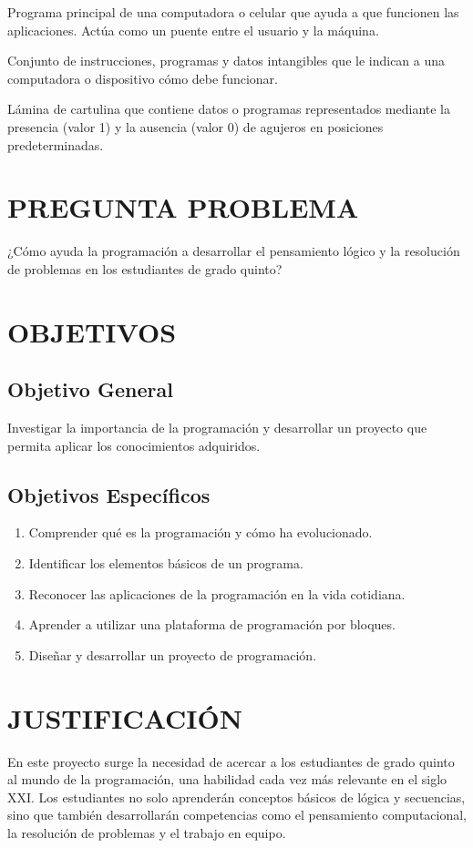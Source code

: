 \documentclass[12pt,letterpaper]{article}
\newenvironment{glosario}{\begin{description}[leftmargin=0pt,labelindent=0pt,itemsep=4pt,font=\normalfont\bfseries]\singlespacing}{\end{description}}
\begin{document}
\begin{glosario}
\item[Sistemas operativos:] Programa principal de una computadora o celular que ayuda a que funcionen las aplicaciones. Actúa como un puente entre el usuario y la máquina.
\item[Software:] Conjunto de instrucciones, programas y datos intangibles que le indican a una computadora o dispositivo cómo debe funcionar.
\item[Tarjetas perforadas:] Lámina de cartulina que contiene datos o programas representados mediante la presencia (valor 1) y la ausencia (valor 0) de agujeros en posiciones predeterminadas.
\end{glosario}

\section{PREGUNTA PROBLEMA}
\noindent ¿Cómo ayuda la programación a desarrollar el pensamiento lógico y la resolución de problemas en los estudiantes de grado quinto?

\section{OBJETIVOS}
\subsection{Objetivo General}
Investigar la importancia de la programación y desarrollar un proyecto que permita aplicar los conocimientos adquiridos.

\subsection{Objetivos Específicos}
\begin{enumerate}[leftmargin=1.27cm]
  \item Comprender qué es la programación y cómo ha evolucionado.
  \item Identificar los elementos básicos de un programa.
  \item Reconocer las aplicaciones de la programación en la vida cotidiana.
  \item Aprender a utilizar una plataforma de programación por bloques.
  \item Diseñar y desarrollar un proyecto de programación.
\end{enumerate}

\section{JUSTIFICACIÓN}
En este proyecto surge la necesidad de acercar a los estudiantes de grado quinto al mundo de la programación, una habilidad cada vez más relevante en el siglo XXI. Los estudiantes no solo aprenderán conceptos básicos de lógica y secuencias, sino que también desarrollarán competencias como el pensamiento computacional, la resolución de problemas y el trabajo en equipo.
\end{document}
